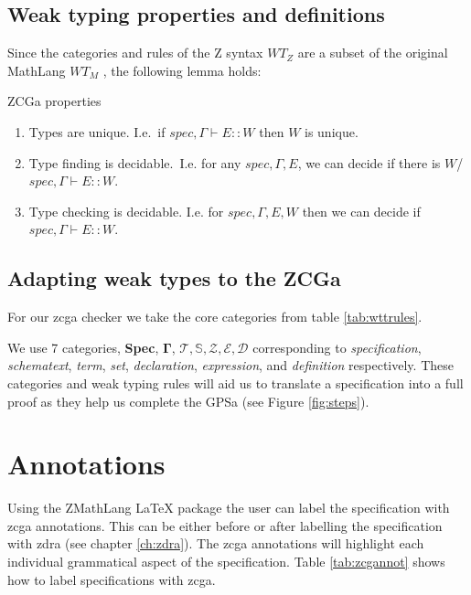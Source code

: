 \subsection{Weak typing properties and definitions}

Since the categories and rules of the Z syntax $WT_{Z}$ are a subset of the
original MathLang $WT_{M}$ \cite{wtt}, the following lemma holds:

\begin{lemma}
ZCGa properties \\

\begin{enumerate}
\item Types are unique. I.e.\ if $spec, \Gamma \vdash E \mathbf{::} W$ then $W$
is unique.

\item Type finding is decidable.\ I.e. for any $spec, \Gamma, E$, we can decide
if there is $W$/ $spec, \Gamma \vdash E \mathbf{::}W$.

\item Type checking is decidable. I.e. for $spec, \Gamma, E, W$ then we can
decide if $spec, \Gamma \vdash E \mathbf{::}W$.
\end{enumerate}
\end{lemma}



\subsection{Adapting weak types to the ZCGa}

For our \gls{zcga} checker we take the core categories from table
\ref{tab:wttrules}.

We use 7 categories, \textbf{Spec}, $\mathbf{\Gamma}$, $\mathcal{T}, \mathbb{S},
\mathcal{Z}, \mathcal{E}, \mathcal{D} $ corresponding to \textit{specification},
\textit{schematext}, \textit{term}, \textit{set}, \textit{declaration},
\textit{expression}, and \textit{definition} respectively. These categories and
weak typing rules will aid us to translate a specification into a full proof as
they help us complete the GPSa (see Figure \ref{fig:steps}).

\section{Annotations}

Using the ZMathLang \LaTeX{} package the user can label the specification with
\gls{zcga} annotations. This can be either before or after labelling the
specification with \gls{zdra} (see chapter \ref{ch:zdra}). The \gls{zcga}
annotations will highlight each individual grammatical aspect of the
specification. Table \ref{tab:zcgannot} shows how to label specifications with
\gls{zcga}.

